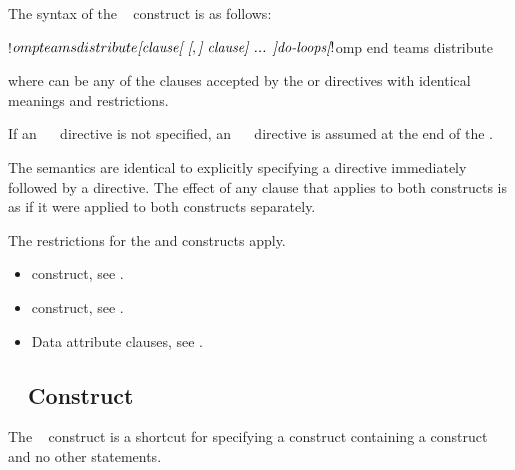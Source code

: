 \begin{fortranspecific}
The syntax of the ~ construct is as follows:

\begin{ompfPragma}
!$omp teams distribute \plc{[clause[ [},\plc{] clause] ... ]}
    \plc{do-loops}
\plc{[}!$omp end teams distribute\plc{]}
\end{ompfPragma}

where  can be any of the clauses accepted by the  or 
directives with identical meanings and restrictions.

If an ~~ directive is not specified, an
~~ directive is assumed at the end of the .
\end{fortranspecific}

\descr
The semantics are identical to explicitly specifying a  directive immediately
followed by a  directive. The effect of any clause that applies to both constructs is as if it were applied to both constructs separately.


\restrictions
The restrictions for the  and  constructs apply.

\crossreferences
\begin{itemize}
\item {} construct, see
.

\item {} construct, see
.

\item Data attribute clauses, see
.
\end{itemize}




\subsection{~ Construct}
\label{subsec:teams loop Construct}
\summary
The ~ construct is a shortcut for specifying a  construct
containing a  construct and no other statements.

